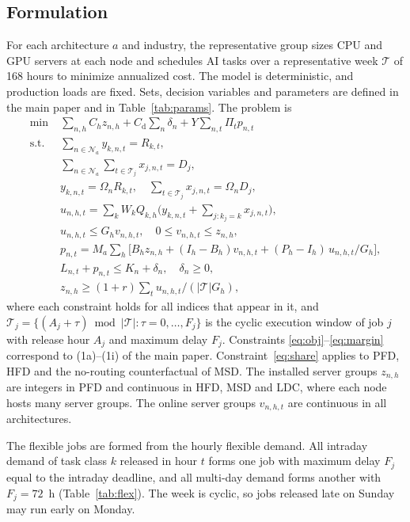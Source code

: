 \documentclass[11pt]{article}
\begin{document}
\subsection*{Formulation}
For each architecture $a$ and industry, the representative group sizes CPU and GPU servers at each node and schedules AI tasks over a representative week $\mathcal{T}$ of 168 hours to minimize annualized cost. The model is deterministic, and production loads are fixed. Sets, decision variables and parameters are defined in the main paper and in Table~\ref{tab:params}. The problem is
\begin{subequations}\label{eq:model}
\begin{align}
\min\;& \sum_{n,h}C_hz_{n,h}+C_{\mathrm{d}}\sum_n\delta_n+Y\sum_{n,t}\Pi_tp_{n,t} \label{eq:obj}\\
\text{s.t.}\;& \sum_{n\in\mathcal{N}_a}y_{k,n,t}=R_{k,t}, \label{eq:firm}\\
& \sum_{n\in\mathcal{N}_a}\sum_{t\in\mathcal{T}_j}x_{j,n,t}=D_j, \label{eq:flex}\\
& y_{k,n,t}=\Omega_nR_{k,t},\quad \sum_{t\in\mathcal{T}_j}x_{j,n,t}=\Omega_nD_j, \label{eq:share}\\
& u_{n,h,t}=\sum_kW_kQ_{k,h}\Big(y_{k,n,t}+\sum_{j:k_j=k}x_{j,n,t}\Big), \label{eq:compute}\\
& u_{n,h,t}\le G_hv_{n,h,t},\quad 0\le v_{n,h,t}\le z_{n,h}, \label{eq:throughput}\\
& p_{n,t}=M_a\sum_h\Big[B_hz_{n,h}+(I_h-B_h)v_{n,h,t}+(P_h-I_h)\,u_{n,h,t}/G_h\Big], \label{eq:power}\\
& L_{n,t}+p_{n,t}\le K_n+\delta_n,\quad \delta_n\ge0, \label{eq:balance}\\
& z_{n,h}\ge(1+r)\sum_{t}u_{n,h,t}/(|\mathcal{T}|G_h), \label{eq:margin}
\end{align}
\end{subequations}
where each constraint holds for all indices that appear in it, and $\mathcal{T}_j=\{(A_j+\tau)\bmod|\mathcal{T}|:\tau=0,\ldots,F_j\}$ is the cyclic execution window of job $j$ with release hour $A_j$ and maximum delay $F_j$. Constraints \eqref{eq:obj}--\eqref{eq:margin} correspond to (1a)--(1i) of the main paper. Constraint~\eqref{eq:share} applies to PFD, HFD and the no-routing counterfactual of MSD. The installed server groups $z_{n,h}$ are integers in PFD and continuous in HFD, MSD and LDC, where each node hosts many server groups. The online server groups $v_{n,h,t}$ are continuous in all architectures.

The flexible jobs are formed from the hourly flexible demand. All intraday demand of task class $k$ released in hour $t$ forms one job with maximum delay $F_j$ equal to the intraday deadline, and all multi-day demand forms another with $F_j=72$~h (Table~\ref{tab:flex}). The week is cyclic, so jobs released late on Sunday may run early on Monday.
\end{document}
